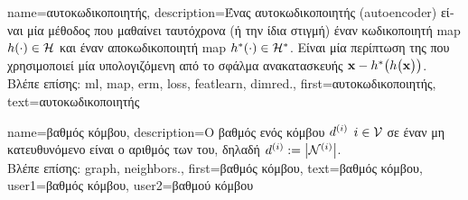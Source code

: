 {name={\foreignlanguage{greek}{αυτοκωδικοποιητής}},
	description={\foreignlanguage{greek}{Ένας αυτοκωδικοποιητής} (autoencoder) 
		\foreignlanguage{greek}{είναι μία μέθοδος}  \foreignlanguage{greek}{που μαθαίνει ταυτόχρονα (ή την ίδια στιγμή)
		έναν κωδικοποιητή} \gls{map} $h(\cdot) \in \mathcal{H}$ \foreignlanguage{greek}{και έναν αποκωδικοποιητή} \gls{map} 
		$h^{*}(\cdot) \in \mathcal{H}^{*}$. \foreignlanguage{greek}{Είναι μία περίπτωση της} 
		 \foreignlanguage{greek}{που χρησιμοποιεί μία}  \foreignlanguage{greek}{υπολογιζόμενη από το 
		σφάλμα ανακατασκευής} ${\bf x} - h^{*}\big(  h \big( {\bf x} \big) \big)$.\\
		\foreignlanguage{greek}{Βλέπε επίσης:} \gls{ml}, \gls{map}, \gls{erm}, \gls{loss}, \gls{featlearn}, \gls{dimred}.},
	first={\foreignlanguage{greek}{αυτοκωδικοποιητής}},
	text={\foreignlanguage{greek}{αυτοκωδικοποιητής}}
}

{name={\foreignlanguage{greek}{βαθμός κόμβου}},
	description={\foreignlanguage{greek}{Ο βαθμός ενός κόμβου} 
		$d^{(i)}$ $i \in \mathcal{V}$ \foreignlanguage{greek}{σε έναν μη κατευ\-θυ\-νόμενο} 
		 \foreignlanguage{greek}{είναι ο αριθμός των}   
		\foreignlanguage{greek}{του, δηλαδή} $d^{(i)} := \big|\mathcal{N}^{(i)}\big|$.\\
		\foreignlanguage{greek}{Βλέπε επίσης:} \gls{graph}, \gls{neighbors}.},
	first={\foreignlanguage{greek}{βαθμός κόμβου}},
	text={\foreignlanguage{greek}{βαθμός κόμβου}},
	user1={\foreignlanguage{greek}{βαθμός κόμβου}}, %
  	user2={\foreignlanguage{greek}{βαθμού κόμβου}} %
}

